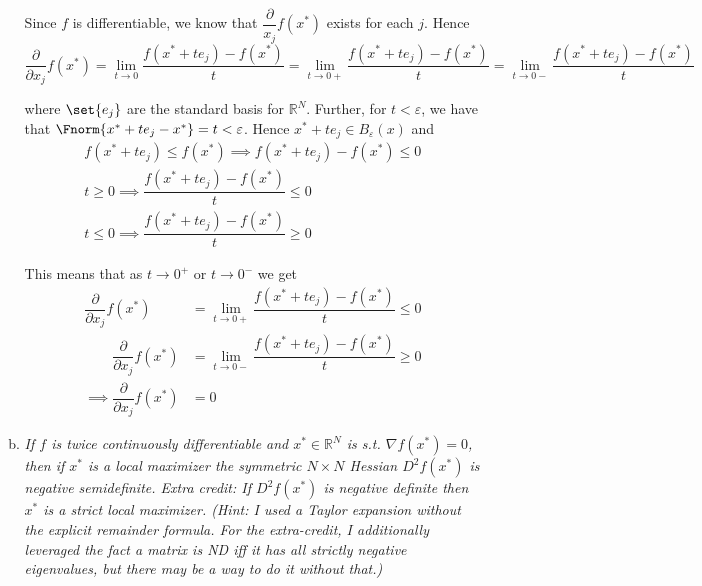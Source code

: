 \documentclass{article}
\begin{document}
\begin{enumerate}[1.]
\begin{enumerate}[a)]
        Since $f$ is differentiable, we know that $\dfrac{\partial}{x_j} f(x^*)$ exists for each $j$. Hence
        \[
          \dfrac{\partial}{\partial x_j} f(x^*)
          =
          \lim_{t \to 0}  \dfrac{f(x^* + t e_j) - f(x^*)}{t}
          =
          \lim_{t \to 0+} \dfrac{f(x^* + t e_j) - f(x^*)}{t}
          =
          \lim_{t \to 0-} \dfrac{f(x^* + t e_j) - f(x^*)}{t}
        \]

        where $\set{e_j}$ are the standard basis for $\mathbb{R}^N$. Further, for $t < \varepsilon$, we have that $\Fnorm{x^* + t e_j - x^*} = t < \varepsilon$. Hence $x^* + t e_j \in B_{\varepsilon}(x)$ and
        \begin{equation}
          \begin{array}{c}
          f(x^* + t e_j) \le f(x^*)
          \implies
          f(x^* + t e_j) - f(x^*)
          \le 0
          \\[6pt]
          t \ge 0
          \implies \dfrac{f(x^* + t e_j) - f(x^*)}{t}
          \le 0
          \\[6pt]
          t \le 0
          \implies \dfrac{f(x^* + t e_j) - f(x^*)}{t}
          \ge 0
          \end{array}
          \label{eq:ps3_eq1}
        \end{equation}

        This means that as $t \to 0^+$ or $t \to 0^-$ we get
        \begin{equation}
          \begin{array}{rl}
            \dfrac{\partial}{\partial x_j} f(x^*)
            & =
            \lim_{t \to 0+} \dfrac{f(x^* + t e_j) - f(x^*)}{t}
            \le 0
            \\[6pt]
            \quad\quad
            \dfrac{\partial}{\partial x_j} f(x^*)
            & =
            \lim_{t \to 0-} \dfrac{f(x^* + t e_j) - f(x^*)}{t}
            \ge 0
            \\[6pt]
            \implies
            \dfrac{\partial}{\partial x_j} f(x^*)
            & = 0
          \end{array}
          \nonumber
        \end{equation}

      \item \textit{If $f$ is twice continuously differentiable and $x^* \in \mathbb{R}^N$ is s.t. $\nabla f(x^*) = 0$, then if $x^*$ is a local maximizer the symmetric $N \times N$ Hessian $D^2f(x^*)$ is negative semidefinite. Extra credit: If $D^2f(x^*)$ is negative definite then $x^*$ is a strict local maximizer. (Hint: I used a Taylor expansion without the explicit remainder formula. For the extra-credit, I additionally leveraged the fact a matrix is ND iff it has all strictly negative eigenvalues, but there may be a way to do it without that.)}


\end{enumerate}
\end{enumerate}
\end{document}
